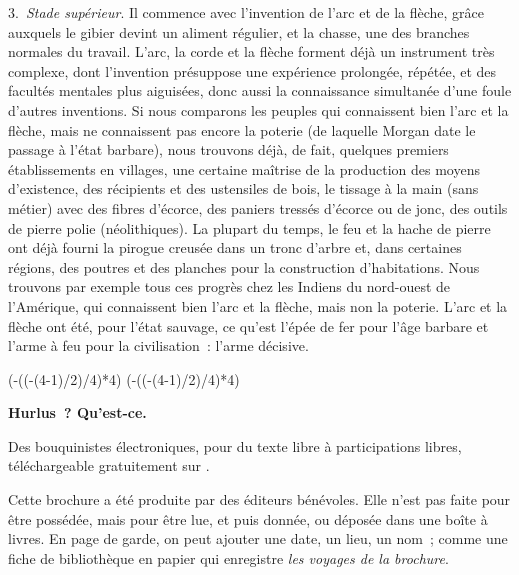 \documentclass[french,twoside]{book} %
\def\truncdiv#1#2{((#1-(#2-1)/2)/#2)}
\def\moduloop#1#2{(#1-\truncdiv{#1}{#2}*#2)}
\def\modulo#1#2{\number\numexpr\moduloop{#1}{#2}\relax}
\begin{document}
3. \emph{Stade supérieur}. Il commence avec l’invention de l’arc et de la flèche, grâce auxquels le gibier devint un aliment régulier, et la chasse, une des branches normales du travail. L’arc, la corde et la flèche forment déjà un instrument très complexe, dont l’invention présuppose une expérience prolongée, répétée, et des facultés mentales plus aiguisées, donc aussi la connaissance simultanée d’une foule d’autres inventions. Si nous comparons les peuples qui connaissent bien l’arc et la flèche, mais ne connaissent pas encore la poterie (de laquelle Morgan date le passage à l’état barbare), nous trouvons déjà, de fait, quelques premiers établissements en villages, une certaine maîtrise de la production des moyens d’existence, des récipients et des ustensiles de bois, le tissage à la main (sans métier) avec des fibres d’écorce, des paniers tressés d’écorce ou de jonc, des outils de pierre polie (néolithiques). La plupart du temps, le feu et la hache de pierre ont déjà fourni la pirogue creusée dans un tronc d’arbre et, dans certaines régions, des poutres et des planches pour la construction d’habitations. Nous trouvons par exemple tous ces progrès chez les Indiens du nord-ouest de l’Amérique, qui connaissent bien l’arc et la flèche, mais non la poterie. L’arc et la flèche ont été, pour l’état sauvage, ce qu’est l’épée de fer pour l’âge barbare et l’arme à feu pour la civilisation : l’arme décisive.
 


\ifbooklet
  \pagestyle{empty}
  \clearpage
  \ifnum\modulo{\value{page}}{4}=0 \hbox{}\newpage\hbox{}\newpage\fi
  \ifnum\modulo{\value{page}}{4}=1 \hbox{}\newpage\hbox{}\newpage\fi


  \hbox{}\newpage
  \ifodd\value{page}\hbox{}\newpage\fi
  {\centering\color{rubric}\bfseries\noindent\large
    Hurlus ? Qu’est-ce.\par
    \bigskip
  }
  \noindent Des bouquinistes électroniques, pour du texte libre à participations libres,
  téléchargeable gratuitement sur \href{https://hurlus.fr}{}.\par
  \bigskip
  \noindent Cette brochure a été produite par des éditeurs bénévoles.
  Elle n’est pas faite pour être possédée, mais pour être lue, et puis donnée, ou déposée dans une boîte à livres.
  En page de garde, on peut ajouter une date, un lieu, un nom ;
  comme une fiche de bibliothèque en papier qui enregistre \emph{les voyages de la brochure}.
  \par
\end{document}
